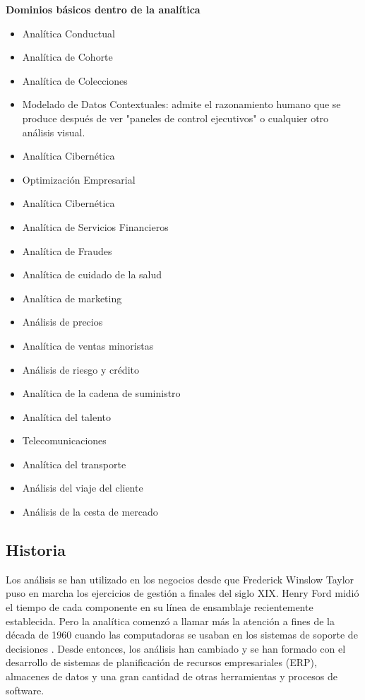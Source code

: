 \documentclass[preprint,12pt]{elsarticle}
\begin{document}
	\textbf{Dominios básicos dentro de la analítica }
	\begin{itemize}
		\item Analítica Conductual
		\item Analítica de Cohorte
		\item Analítica de Colecciones
		\item Modelado de Datos Contextuales: admite el razonamiento humano que se produce después de ver "paneles de control ejecutivos" o cualquier otro análisis visual.
		\item Analítica Cibernética
		\item Optimización Empresarial
		\item Analítica Cibernética
		\item Analítica de Servicios Financieros
		\item Analítica de Fraudes
		\item Analítica de cuidado de la salud
		\item Analítica de marketing
		\item Análisis de precios
		\item Analítica de ventas minoristas
		\item Análisis de riesgo y crédito
		\item Analítica de la cadena de suministro
		\item Analítica del talento
		\item Telecomunicaciones
		\item Analítica del transporte
		\item Análisis del viaje del cliente
		\item Análisis de la cesta de mercado
		
	\end{itemize}
	\subsection{Historia}
	Los análisis se han utilizado en los negocios desde que Frederick Winslow Taylor puso en marcha los ejercicios de gestión a finales del siglo XIX. Henry Ford midió el tiempo de cada componente en su línea de ensamblaje recientemente establecida. Pero la analítica comenzó a llamar más la atención a fines de la década de 1960 cuando las computadoras se usaban en los sistemas de soporte de decisiones . Desde entonces, los análisis han cambiado y se han formado con el desarrollo de sistemas de planificación de recursos empresariales (ERP), almacenes de datos y una gran cantidad de otras herramientas y procesos de software. \cite{bib04:BA:Online} \\
	
\end{document}

